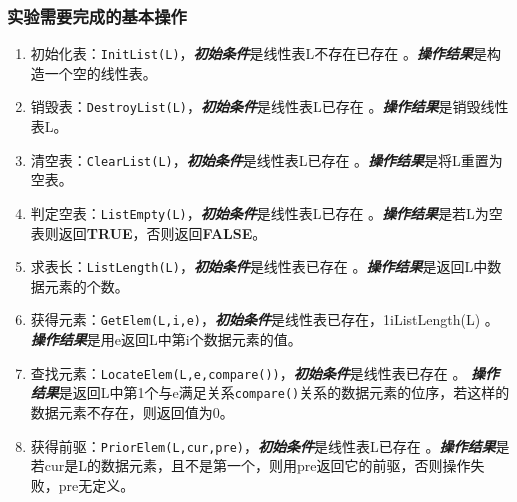 \subsubsection{实验需要完成的基本操作}
\begin{enumerate}
\item 初始化表：\texttt{InitList(L)}，\newline \textbf{\emph{初始条件}}是线性表L不存在已存在 。\newline \textbf{\emph{操作结果}}是构造一个空的线性表。
\item 销毁表：\texttt{DestroyList(L)}，\newline \textbf{\emph{初始条件}}是线性表L已存在 。\newline \textbf{\emph{操作结果}}是销毁线性表L。
\item 清空表：\texttt{ClearList(L)}，\newline \textbf{\emph{初始条件}}是线性表L已存在 。\newline \textbf{\emph{操作结果}}是将L重置为空表。
\item 判定空表：\texttt{ListEmpty(L)}，\newline \textbf{\emph{初始条件}}是线性表L已存在 。\newline \textbf{\emph{操作结果}}是若L为空表则返回\textbf{TRUE}，否则返回\textbf{FALSE}。
\item 求表长：\texttt{ListLength(L)}，\newline \textbf{\emph{初始条件}}是线性表已存在 。\newline \textbf{\emph{操作结果}}是返回L中数据元素的个数。
\item 获得元素：\texttt{GetElem(L,i,e)}，\newline \textbf{\emph{初始条件}}是线性表已存在，1\le i\le ListLength(L) 。\newline \textbf{\emph{操作结果}}是用e返回L中第i个数据元素的值。
\item 查找元素：\texttt{LocateElem(L,e,compare())}，\newline \textbf{\emph{初始条件}}是线性表已存在 。\newline
    \textbf{\emph{操作结果}}是返回L中第1个与e满足关系\texttt{compare()}关系的数据元素的位序，若这样的数据元素不存在，则返回值为0。
\item 获得前驱：\texttt{PriorElem(L,cur,pre)}，\newline \textbf{\emph{初始条件}}是线性表L已存在 。\newline \textbf{\emph{操作结果}}是若cur是L的数据元素，且不是第一个，则用pre返回它的前驱，否则操作失败，pre无定义。

\end{enumerate}
